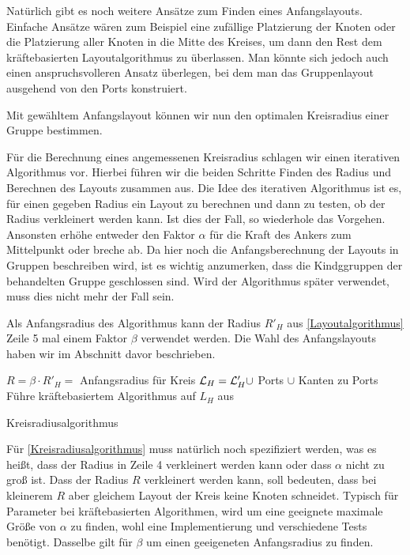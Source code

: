 Natürlich gibt es  noch weitere Ansätze zum Finden eines Anfangslayouts.
Einfache Ansätze wären zum Beispiel eine zufällige Platzierung der Knoten oder die Platzierung aller Knoten in die Mitte des Kreises, 
um dann den Rest dem kräftebasierten Layoutalgorithmus zu überlassen. 
Man könnte sich jedoch auch einen anspruchsvolleren Ansatz überlegen, bei dem man das Gruppenlayout ausgehend von den Ports konstruiert.

Mit gewähltem Anfangslayout können wir nun den optimalen Kreisradius einer Gruppe bestimmen.

Für die Berechnung eines angemessenen Kreisradius schlagen wir einen iterativen Algorithmus vor. \label{Radius}
Hierbei führen wir die beiden Schritte Finden des Radius und Berechnen des Layouts zusammen aus.
Die Idee des iterativen Algorithmus ist es, für einen gegeben Radius ein Layout zu berechnen und dann zu testen, ob der Radius verkleinert werden kann.
Ist dies der Fall, so wiederhole das Vorgehen. Ansonsten erhöhe entweder den Faktor $\alpha$ für die Kraft des Ankers zum Mittelpunkt oder breche ab. 
Da hier noch die Anfangsberechnung der Layouts in Gruppen beschreiben wird, ist es wichtig anzumerken, dass die Kindggruppen der behandelten Gruppe 
geschlossen %
sind.
Wird der Algorithmus später verwendet, muss dies nicht mehr der Fall sein.

Als Anfangsradius des Algorithmus kann der Radius $R'_H$ aus \autoref{Layoutalgorithmus} Zeile 5 mal einem Faktor $\beta$ verwendet werden.
Die Wahl des Anfangslayouts haben wir im Abschnitt davor beschrieben.

\begin{algorithm}[H]
\label{Kreisradiusalgorithmus}
\SetAlgoLined
{}
$R = \beta \cdot R'_H = $ Anfangsradius für Kreis\;
$\mathcal{L}_H = \mathcal{L}'_H \cup$ Ports $\cup$  Kanten zu Ports\;
Führe kräftebasiertem Algorithmus auf  $L_H$ aus\;
\caption{Kreisradiusalgorithmus}
\end{algorithm}

Für \autoref{Kreisradiusalgorithmus} muss natürlich noch spezifiziert werden, was es heißt, dass der Radius in Zeile 4 verkleinert werden kann
oder dass $\alpha$ nicht zu groß ist. 
Dass der Radius $R$ verkleinert werden kann, soll bedeuten, dass bei kleinerem $R$ aber gleichem Layout der Kreis keine Knoten schneidet. 
Typisch für Parameter bei kräftebasierten Algorithmen, wird um eine geeignete maximale Größe von $\alpha$ zu finden, wohl eine Implementierung und verschiedene Tests benötigt. 
Dasselbe gilt für $\beta$ um einen geeigeneten Anfangsradius zu finden.

